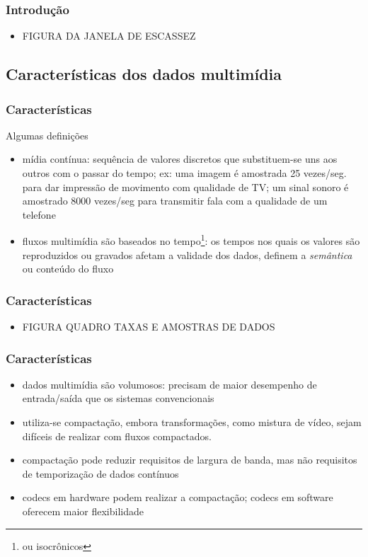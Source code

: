 \documentclass[]{beamer}
\begin{document}
\begin{frame}
  \frametitle{Introdução}
\begin{itemize}
  \item FIGURA DA JANELA DE ESCASSEZ
\end{itemize}
\end{frame}

\subsection{Características dos dados multimídia}

\begin{frame}
  \frametitle{Características}
Algumas definições
\begin{itemize}
  \item mídia contínua: sequência de valores discretos que substituem-se uns aos outros
com o passar do tempo; ex: uma imagem é amostrada 25 vezes/seg. para 
dar impressão de movimento com qualidade de TV; um sinal sonoro é amostrado
8000 vezes/seg para transmitir fala com a qualidade de um telefone
  \item fluxos multimídia são baseados no tempo\footnote{ou isocrônicos}: os tempos nos quais
os valores são reproduzidos ou gravados afetam a validade dos dados, definem 
a \emph{semântica} ou conteúdo do fluxo
  
\end{itemize}
\end{frame}

\begin{frame}
  \frametitle{Características}
\begin{itemize}
  \item FIGURA QUADRO TAXAS E AMOSTRAS DE DADOS
\end{itemize}
\end{frame}

\begin{frame}
  \frametitle{Características}
\begin{itemize}
\item dados multimídia são volumosos: precisam de maior desempenho de entrada/saída que os
sistemas convencionais
  \item utiliza-se compactação, embora transformações, como mistura de vídeo, sejam 
difíceis de realizar com fluxos compactados.
  \item compactação pode reduzir requisitos de largura de banda, mas não requisitos de
temporização de dados contínuos
  \item codecs em hardware podem realizar a compactação; codecs em software oferecem
maior flexibilidade
\end{itemize}
\end{frame}
\end{document}
